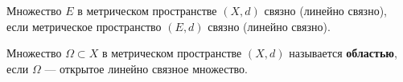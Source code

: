 \documentclass[11pt]{article}
\begin{document}
\begin{definition}
    Множество $E$ в метрическом пространстве $(X, d)$ связно (линейно связно), если метрическое 
    пространство $(E, d)$ связно (линейно связно).
\end{definition}

\begin{definition}
    Множество $\Omega \subset X$ в метрическом пространстве $(X, d)$ называется \textbf{областью},
    если $\Omega$ --- открытое линейно связное множество.
\end{definition}
\end{document}

